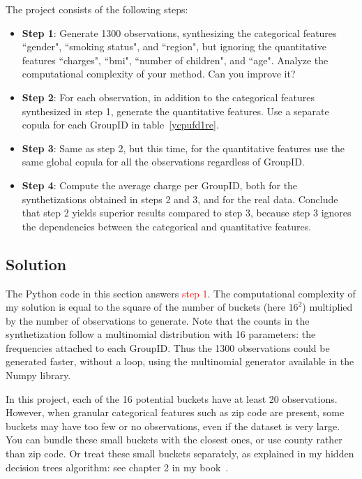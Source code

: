 \documentclass[oneside,10pt]{book}
\begin{document}
\pagebreak %
\noindent The project consists of the following steps: \vspace{1ex}
\begin{itemize}
\item[] {\bf Step 1}: Generate 1300 observations, synthesizing the categorical features ``gender", ``smoking status", and ``region", but ignoring the quantitative features ``charges", ``bmi", ``number of children", and ``age". Analyze the computational complexity of your method. Can you improve it?  \vspace{1ex}
\item[] {\bf Step 2}: For each observation, in addition to the categorical features synthesized in step 1, generate the quantitative features. Use a separate copula
 for each GroupID in table~\ref{ycpufd1re}. \vspace{1ex}
\item[] {\bf Step 3}: Same as step 2, but this time, for the quantitative features use the same global copula for all the observations regardless of GroupID.\vspace{1ex}
\item[] {\bf Step 4}: Compute the average charge per GroupID, both for the synthetizations obtained in steps 2 and 3, and for the real data. 
Conclude that step 2 yields superior results compared to step 3,  because step 3 ignores the dependencies between the categorical
 and quantitative features. 
\end{itemize}

\subsection{Solution}

\noindent The Python code in this section answers \textcolor{red}{step 1}.  The computational complexity of my solution is equal to the square of the number of buckets  (here $16^2$) multiplied by the number of observations to generate. Note that the counts in the synthetization follow a 
 \textcolor{index}{multinomial distribution} with 16 parameters: the frequencies attached to each GroupID. Thus the 1300 observations could be generated faster, without a loop, using the multinomial generator available in the Numpy library.

In this project, each of the 16 potential buckets have at least 20 observations. However, when granular categorical features such as zip code are present, some buckets may have too few or no observations, even if the dataset is very large. You can bundle these small buckets with the closest ones, or use county rather than zip code. Or treat these small buckets separately, as explained in my hidden decision trees algorithm: see chapter 2 in my book~\cite{vgelsevier}.
 
\end{document}

